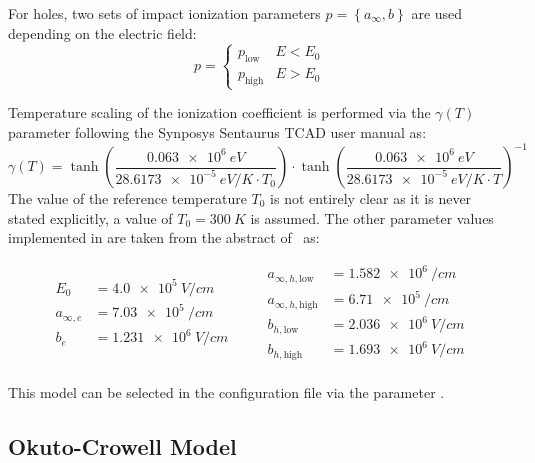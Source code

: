 For holes, two sets of impact ionization parameters $p = \left\{ a_{\infty}, b \right\}$ are used depending on the electric field:
\begin{equation}
    \label{eq:multi:man:h}
    p = \left\{
    \begin{array}{ll}
        p_{\textrm{low}} & E < E_{0}\\
        p_{\textrm{high}} & E > E_{0}
    \end{array}
    \right.
\end{equation}

Temperature scaling of the ionization coefficient is performed  via the $\gamma(T)$ parameter following the Synposys Sentaurus TCAD user manual as:
\begin{equation}
    \label{eq:multi:man:gamma}
    \gamma (T) = \tanh \left(\frac{\SI{0.063e6}{eV}}{2 \SI{8.6173e-5}{eV/K} \cdot T_0} \right) \cdot \tanh \left(\frac{\SI{0.063e6}{eV}}{2 \SI{8.6173e-5}{eV/K} \cdot T} \right)^{-1}
\end{equation}
The value of the reference temperature $T_0$ is not entirely clear as it is never stated explicitly, a value of $T_0 = \SI{300}{K}$ is assumed.
The other parameter values implemented in \apsq are taken from the abstract of~\cite{overstraeten} as:

\begin{equation*}
    \begin{split}
        E_0 &= \SI{4.0e5}{V/cm}\\
        a_{\infty, e} &= \SI{7.03e5}{/cm}\\
        b_{e} &= \SI{1.231e6}{V/cm}\\
    \end{split}
    \qquad
    \begin{split}
        a_{\infty, h, \textrm{low}} &= \SI{1.582e6}{/cm}\\
        a_{\infty, h, \textrm{high}} &= \SI{6.71e5}{/cm}\\
        b_{h, \textrm{low}} &= \SI{2.036e6}{V/cm}\\
        b_{h, \textrm{high}} &= \SI{1.693e6}{V/cm}\\
    \end{split}
\end{equation*}

This model can be selected in the configuration file via the parameter .

\subsection{Okuto-Crowell Model}
\label{sec:multi:oku}

